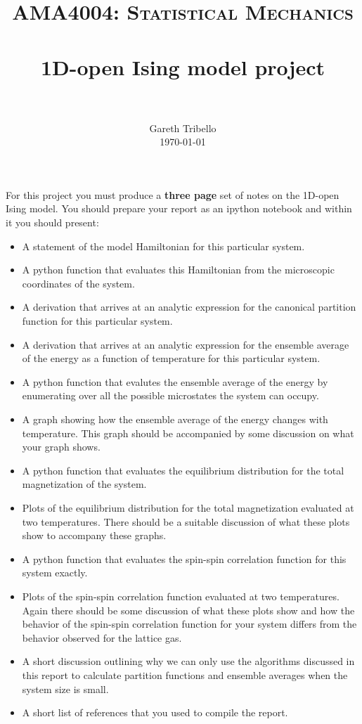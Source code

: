 \documentclass[paper=a4, fontsize=11pt]{scrartcl}
\title{\usefont{OT1}{bch}{b}{n} \normalfont \normalsize \textsc{AMA4004:
Statistical Mechanics} \\ [25pt] \horrule{0.5pt} \\[0.4cm] 
\huge 1D-open Ising model project \\
\horrule{2pt} \\[0.25cm]
}
\author{ \normalfont
\normalsize
        Gareth Tribello \\[-3pt] \normalsize
        \today
}
\date{}
\numberwithin{equation}{section}
\numberwithin{figure}{section}
\numberwithin{table}{section}
\begin{document}
\maketitle

For this project you must produce a {\bf three page} set of notes on the 1D-open Ising model.  You should prepare your report as an ipython notebook and within 
it you should present:

\begin{itemize}
 \item A statement of the model Hamiltonian for this particular system.
 \item A python function that evaluates this Hamiltonian from the microscopic coordinates of the system. 
 \item A derivation that arrives at an analytic expression for the canonical partition function for this particular system.
 \item A derivation that arrives at an analytic expression for the ensemble average of the energy as a function of temperature for this particular system.
 \item A python function that evalutes the ensemble average of the energy by enumerating over all the possible microstates the system can occupy.  
 \item A graph showing how the ensemble average of the energy changes with temperature.  This graph should be accompanied by some discussion on what your graph shows.
 \item A python function that evaluates the equilibrium distribution for the total magnetization of the system.
 \item Plots of the equilibrium distribution for the total magnetization evaluated at two temperatures.  There should be a suitable discussion of what these plots show to accompany these graphs.
 \item A python function that evaluates the spin-spin correlation function for this system exactly.
 \item Plots of the spin-spin correlation function evaluated at two temperatures.  Again there should be some discussion of what these plots show and how the behavior of the spin-spin correlation function for your system differs from the behavior observed for the lattice gas.
 \item A short discussion outlining why we can only use the algorithms discussed in this report to calculate partition functions and ensemble averages when the system size is small.
 \item A short list of references that you used to compile the report.
\end{itemize}
\end{document}
